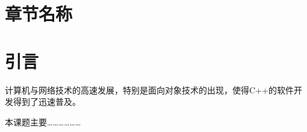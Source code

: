 \documentclass[../../main.tex]{subfiles}
\begin{document}
\section{章节名称}

\section{引言}
计算机与网络技术的高速发展，特别是面向对象技术的出现，使得C++的软件开发得到了迅速普及。

本课题主要………………
\end{document}

